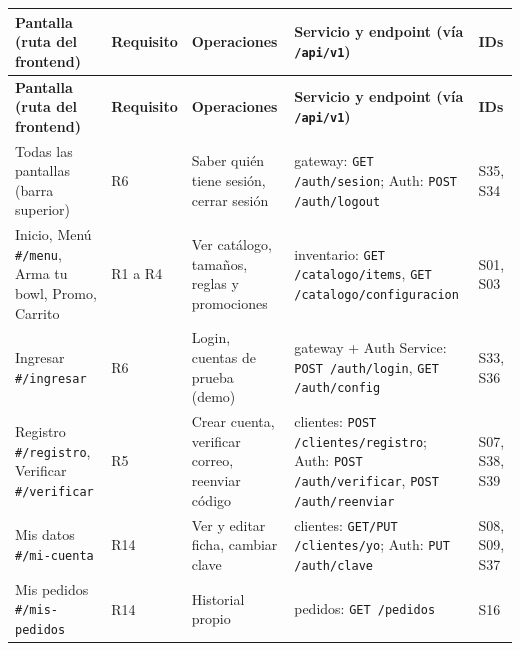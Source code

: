 {\footnotesize
\setlength{\tabcolsep}{3pt}\renewcommand{\arraystretch}{1.15}
\begin{longtable}{|>{\raggedright\arraybackslash}p{}|>{\raggedright\arraybackslash}p{}|>{\raggedright\arraybackslash}p{}|>{\raggedright\arraybackslash}p{}|>{\raggedright\arraybackslash}p{}|}
\hline
\textbf{Pantalla (ruta del frontend)} & \textbf{Requisito} & \textbf{Operaciones} & \textbf{Servicio y endpoint (vía \texttt{/\allowbreak{}api/\allowbreak{}v1})} & \textbf{IDs} \\ \hline
\endfirsthead
\hline
\textbf{Pantalla (ruta del frontend)} & \textbf{Requisito} & \textbf{Operaciones} & \textbf{Servicio y endpoint (vía \texttt{/\allowbreak{}api/\allowbreak{}v1})} & \textbf{IDs} \\ \hline
\endhead
Todas las pantallas (barra superior) & R6 & Saber quién tiene sesión, cerrar sesión & gateway: \texttt{GET /\allowbreak{}auth/\allowbreak{}sesion}; Auth: \texttt{POST /\allowbreak{}auth/\allowbreak{}logout} & S35, S34 \\ \hline
Inicio, Menú \texttt{\#/\allowbreak{}menu}, Arma tu bowl, Promo, Carrito & R1 a R4 & Ver catálogo, tamaños, reglas y promociones & inventario: \texttt{GET /\allowbreak{}catalogo/\allowbreak{}items}, \texttt{GET /\allowbreak{}catalogo/\allowbreak{}configuracion} & S01, S03 \\ \hline
Ingresar \texttt{\#/\allowbreak{}ingresar} & R6 & Login, cuentas de prueba (demo) & gateway + Auth Service: \texttt{POST /\allowbreak{}auth/\allowbreak{}login}, \texttt{GET /\allowbreak{}auth/\allowbreak{}config} & S33, S36 \\ \hline
Registro \texttt{\#/\allowbreak{}registro}, Verificar \texttt{\#/\allowbreak{}verificar} & R5 & Crear cuenta, verificar correo, reenviar código & clientes: \texttt{POST /\allowbreak{}clientes/\allowbreak{}registro}; Auth: \texttt{POST /\allowbreak{}auth/\allowbreak{}verificar}, \texttt{POST /\allowbreak{}auth/\allowbreak{}reenviar} & S07, S38, S39 \\ \hline
Mis datos \texttt{\#/\allowbreak{}mi-\allowbreak{}cuenta} & R14 & Ver y editar ficha, cambiar clave & clientes: \texttt{GET/\allowbreak{}PUT /\allowbreak{}clientes/\allowbreak{}yo}; Auth: \texttt{PUT /\allowbreak{}auth/\allowbreak{}clave} & S08, S09, S37 \\ \hline
Mis pedidos \texttt{\#/\allowbreak{}mis-\allowbreak{}pedidos} & R14 & Historial propio & pedidos: \texttt{GET /\allowbreak{}pedidos} & S16 \\ \hline

\end{longtable}}
